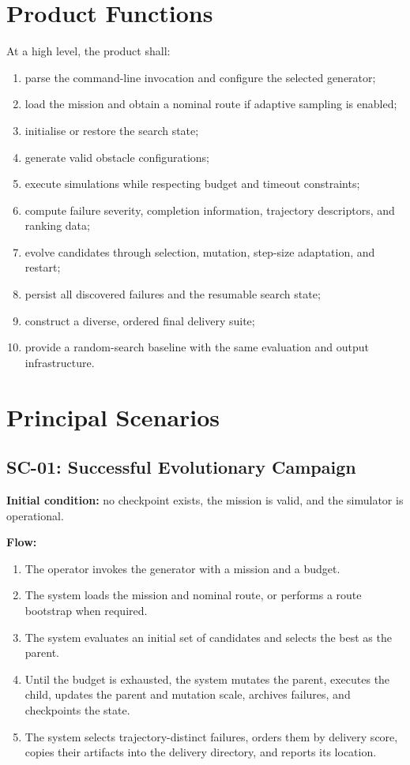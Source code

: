 \documentclass[11pt,a4paper,openany]{report}
\begin{document}
\section{Product Functions}
At a high level, the product shall:
\begin{enumerate}
  \item parse the command-line invocation and configure the selected generator;
  \item load the mission and obtain a nominal route if adaptive sampling is enabled;
  \item initialise or restore the search state;
  \item generate valid obstacle configurations;
  \item execute simulations while respecting budget and timeout constraints;
  \item compute failure severity, completion information, trajectory descriptors, and ranking data;
  \item evolve candidates through selection, mutation, step-size adaptation, and restart;
  \item persist all discovered failures and the resumable search state;
  \item construct a diverse, ordered final delivery suite;
  \item provide a random-search baseline with the same evaluation and output infrastructure.
\end{enumerate}

\section{Principal Scenarios}
\subsection{SC-01: Successful Evolutionary Campaign}
\textbf{Initial condition:} no checkpoint exists, the mission is valid, and the simulator is operational.

\textbf{Flow:}
\begin{enumerate}
  \item The operator invokes the generator with a mission and a budget.
  \item The system loads the mission and nominal route, or performs a route bootstrap when required.
  \item The system evaluates an initial set of candidates and selects the best as the parent.
  \item Until the budget is exhausted, the system mutates the parent, executes the child, updates the parent and mutation scale, archives failures, and checkpoints the state.
  \item The system selects trajectory-distinct failures, orders them by delivery score, copies their artifacts into the delivery directory, and reports its location.
\end{enumerate}
\end{document}

